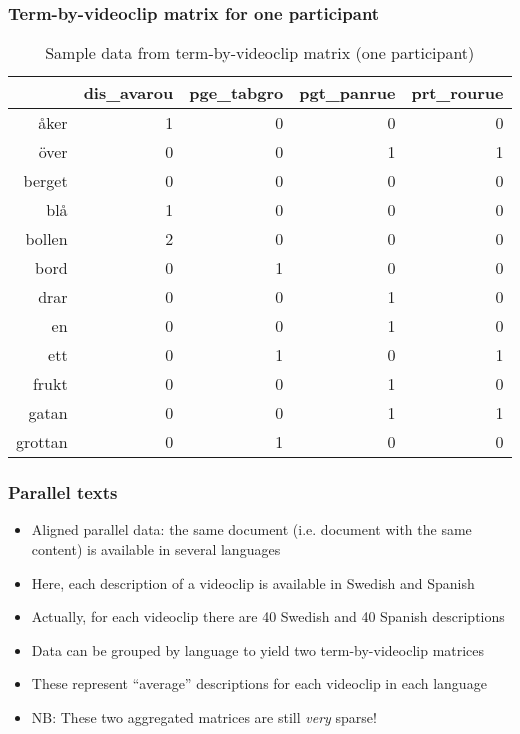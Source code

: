 \documentclass[]{beamer}
\begin{document}
\begin{frame}
	\frametitle{Term-by-videoclip matrix for one participant}
	\begin{table}[ht]
		\begin{center}
		\begin{tabular}{rrrrr}
		  \hline
		 & dis\_avarou & pge\_tabgro & pgt\_panrue & prt\_rourue \\ 
		  \hline
		\aa ker &   1 &   0 &   0 &   0 \\ 
		  \"{o}ver &   0 &   0 &   1 &   1 \\ 
		  berget &   0 &   0 &   0 &   0 \\ 
		  bl\aa &   1 &   0 &   0 &   0 \\ 
		  bollen &   2 &   0 &   0 &   0 \\ 
		  bord &   0 &   1 &   0 &   0 \\ 
		  drar &   0 &   0 &   1 &   0 \\ 
		  en &   0 &   0 &   1 &   0 \\ 
		  ett &   0 &   1 &   0 &   1 \\ 
		  frukt &   0 &   0 &   1 &   0 \\ 
		  gatan &   0 &   0 &   1 &   1 \\ 
		  grottan &   0 &   1 &   0 &   0 \\ 
		 \hline
		\end{tabular}
		\end{center}
		\caption{Sample data from term-by-videoclip matrix (one participant)}
	\end{table}
\end{frame}



\begin{frame}
	\frametitle{Parallel texts}
	\begin{itemize}
		\item Aligned parallel data: the same document (i.e. document with the same content) is available in several languages \pause
		\item Here, each description of a videoclip is available in Swedish and Spanish 
	 	\item Actually, for each videoclip there are 40 Swedish and 40 Spanish descriptions
	 	\item Data can be grouped by language to yield two term-by-videoclip matrices
	 	\item These represent ``average'' descriptions for each videoclip in each language
	 	\item NB: These two aggregated matrices are still \emph{very} sparse!
	\end{itemize}
\end{frame}
\end{document}
